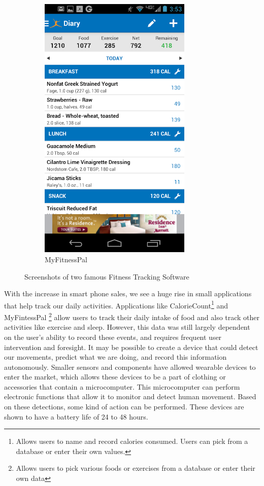 \begin{figure}
\begin{subfigure}[b]{0.4\textwidth}
\includegraphics[width=0.8\textwidth]{images/MyFitScreenshot.png}
\caption{MyFitnessPal}
\label{fig:MyFitScreenshot}
\end{subfigure}
\caption{Screenshots of two famous Fitness Tracking Software}
\label{fig:FitnessScreenshots}
\end{figure}
With the increase in smart phone sales,
we see a huge rise in small applications that help track our daily activities.
Applications like CalorieCount\footnote{Allows users to name and record calories consumed.
Users can pick from a database or enter their own values.} \cite{Web:CalorieCount} and MyFintessPal
\footnote{Allows users to pick various foods or exercises from a database or enter their own data} \cite{Web:MFP}
allow users to track their daily intake of food and also track other activities like exercise and sleep.
However, this data was still largely dependent on the user's ability to record these events,
and requires frequent user intervention and foresight.
It may be possible to create a device that could detect our movements,
predict what we are doing, and record this information autonomously.
Smaller sensors and components have allowed wearable devices to enter the market,
which allows these devices to be a part of clothing or accessories that contain
a microcomputer. This microcomputer can perform electronic functions that allow it to monitor and
detect human movement. Based on these detections, some kind of action can be performed.
These devices are shown to have a battery life of 24 to 48 hours.

